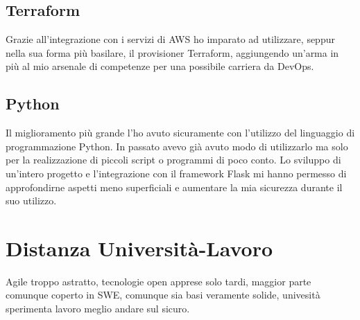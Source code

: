 \subsection{Terraform}
Grazie all'integrazione con i servizi di AWS ho imparato ad utilizzare, seppur nella sua forma più basilare, il provisioner Terraform, aggiungendo un'arma in più al mio arsenale di competenze per una possibile carriera da DevOps.
\subsection{Python}
Il miglioramento più grande l'ho avuto sicuramente con l'utilizzo del linguaggio di programmazione Python. In passato avevo già avuto modo di utilizzarlo ma solo per la realizzazione di piccoli script o programmi di poco conto. Lo sviluppo di un'intero progetto e l'integrazione con il \gls{framework} Flask mi hanno permesso di approfondirne aspetti meno superficiali e aumentare la mia sicurezza durante il suo utilizzo. 
\section{Distanza Università-Lavoro}
Agile troppo astratto, tecnologie open apprese solo tardi, maggior parte comunque coperto in SWE, comunque sia basi veramente solide, univesità sperimenta lavoro meglio andare sul sicuro.